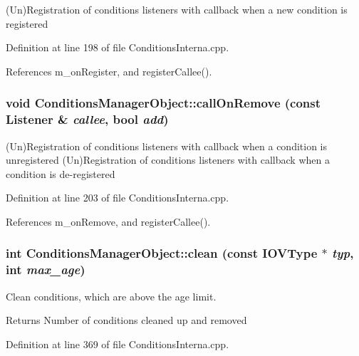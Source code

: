 (Un)Registration of conditions listeners with callback when a new condition is registered 

Definition at line 198 of file ConditionsInterna.cpp.

References m\_\-onRegister, and registerCallee().\hypertarget{class_d_d4hep_1_1_conditions_1_1_conditions_manager_object_a4a8912db5a30d6792455aef57c223bed}{
\subsubsection[{callOnRemove}]{\setlength{\rightskip}{0pt plus 5cm}void ConditionsManagerObject::callOnRemove (const {\bf Listener} \& {\em callee}, \/  bool {\em add})}}
\label{class_d_d4hep_1_1_conditions_1_1_conditions_manager_object_a4a8912db5a30d6792455aef57c223bed}


(Un)Registration of conditions listeners with callback when a condition is unregistered (Un)Registration of conditions listeners with callback when a condition is de-\/registered 

Definition at line 203 of file ConditionsInterna.cpp.

References m\_\-onRemove, and registerCallee().\hypertarget{class_d_d4hep_1_1_conditions_1_1_conditions_manager_object_aca6c43594d93ab8773e245b8cffb0f60}{
\subsubsection[{clean}]{\setlength{\rightskip}{0pt plus 5cm}int ConditionsManagerObject::clean (const {\bf IOVType} $\ast$ {\em typ}, \/  int {\em max\_\-age})}}
\label{class_d_d4hep_1_1_conditions_1_1_conditions_manager_object_aca6c43594d93ab8773e245b8cffb0f60}


Clean conditions, which are above the age limit. \begin{DoxyReturn}{Returns}
Number of conditions cleaned up and removed 
\end{DoxyReturn}


Definition at line 369 of file ConditionsInterna.cpp.

